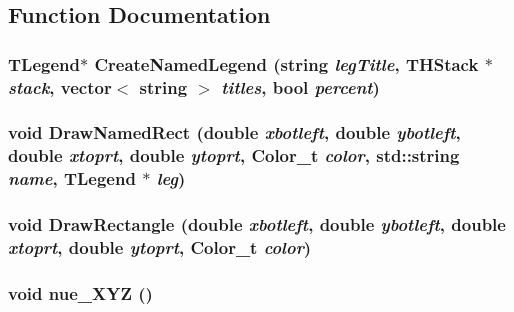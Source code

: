 \subsection{Function Documentation}
\hypertarget{nue__XYZ_8C_a8188ddbc4f225306acb50c18a178dfb4}{
\subsubsection[{CreateNamedLegend}]{\setlength{\rightskip}{0pt plus 5cm}TLegend$\ast$ CreateNamedLegend (string {\em legTitle}, \/  THStack $\ast$ {\em stack}, \/  vector$<$ string $>$ {\em titles}, \/  bool {\em percent})}}
\label{nue__XYZ_8C_a8188ddbc4f225306acb50c18a178dfb4}
\hypertarget{nue__XYZ_8C_aa836ed978fdaec6efd39bfa1bfe9fd01}{
\subsubsection[{DrawNamedRect}]{\setlength{\rightskip}{0pt plus 5cm}void DrawNamedRect (double {\em xbotleft}, \/  double {\em ybotleft}, \/  double {\em xtoprt}, \/  double {\em ytoprt}, \/  Color\_\-t {\em color}, \/  std::string {\em name}, \/  TLegend $\ast$ {\em leg})}}
\label{nue__XYZ_8C_aa836ed978fdaec6efd39bfa1bfe9fd01}
\hypertarget{nue__XYZ_8C_af5f4134ee179dee101f540be506e38d6}{
\subsubsection[{DrawRectangle}]{\setlength{\rightskip}{0pt plus 5cm}void DrawRectangle (double {\em xbotleft}, \/  double {\em ybotleft}, \/  double {\em xtoprt}, \/  double {\em ytoprt}, \/  Color\_\-t {\em color})}}
\label{nue__XYZ_8C_af5f4134ee179dee101f540be506e38d6}
\hypertarget{nue__XYZ_8C_a2b0fd74e557219bb591fda3c3a21babb}{
\subsubsection[{nue\_\-XYZ}]{\setlength{\rightskip}{0pt plus 5cm}void nue\_\-XYZ ()}}
\label{nue__XYZ_8C_a2b0fd74e557219bb591fda3c3a21babb}
